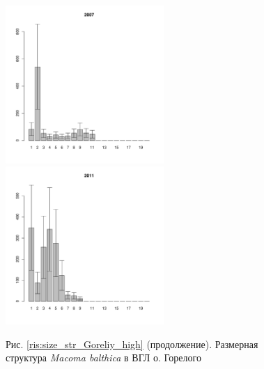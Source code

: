 \documentclass[12pt, a4paper]{article}
\begin{document}
\begin{figure}[h]

\begin{multicols}{3}
\hfill
\includegraphics[width=60mm]{../White_Sea/Luvenga_Goreliy/high_2007_.pdf}
\hfill
\includegraphics[width=60mm]{../White_Sea/Luvenga_Goreliy/high_2011_.pdf}
\end{multicols}


\begin{center}
Рис. \ref{ris:size_str_Goreliy_high} (продолжение). Размерная структура {\it Macoma balthica} в ВГЛ о. Горелого


\end{center}
\end{figure}
\end{document}
